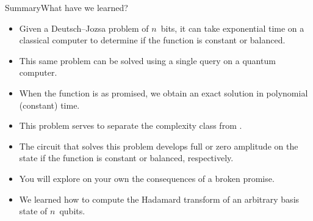 \begin{frame}{Summary}{What have we learned?}

\begin{itemize}[<+->]
    \item Given a Deutsch--Jozsa problem of $n$~bits, it can take exponential time on a classical computer to determine if the function is constant or balanced.
    \item This same problem can be solved using a single query on a quantum computer.
    \item When the function is as promised, we obtain an exact solution in polynomial (constant) time.
    \item This problem serves to separate the complexity class  from .
    \item The circuit that solves this problem develops full or zero amplitude on the  state if the function is constant or balanced, respectively.
    \item You will explore on your own the consequences of a broken promise.
    \item We learned how to compute the Hadamard transform of an arbitrary basis state of $n$~qubits.
\end{itemize}
    
\end{frame}

    
